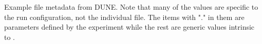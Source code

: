 \documentclass[../main-v1.tex]{subfiles}
\begin{document}













Example file metadata from DUNE. Note that many of the values are specific to the run configuration, not the individual file. The items with "." in them are parameters defined by the experiment while the rest are generic values intrinsic to .
\end{document}
